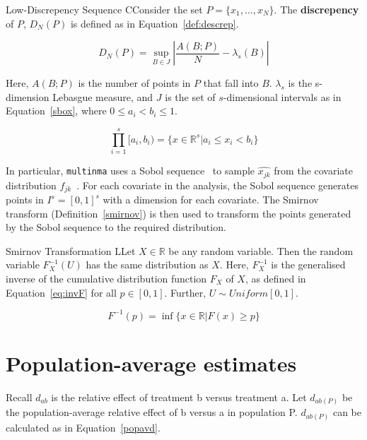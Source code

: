 \begin{definition}{Low-Discrepency Sequence}
    CConsider the set $P = \{x_1, \ldots, x_N\}$. The \textbf{discrepency} of $P$, $D_N(P)$ is defined as in Equation~\ref{def:descrep}.

    \begin{equation}
        D_N(P) = \sup_{B \in J}\left|\frac{A(B;P)}{N} - \lambda_s(B)\right|
        \label{def:descrep}
    \end{equation}

    Here, $A(B;P)$ is the number of points in $P$ that fall into $B$. $\lambda_s$ is the s-dimension Lebasgue measure, and $J$ is the set of $s$-dimensional intervals as in Equation~\ref{sbox}, where $0 \leq a_i < b_i \leq 1$.
    
    \begin{equation}
        \prod_{i = 1}^{s} [a_i,b_i) = \{x \in \mathbb{R}^s | a_i \leq x_i < b_i \}
        \label{sbox}
    \end{equation}
\label{discrepency}
\end{definition}

In particular, \verb|multinma| uses a Sobol sequence~\cite{sobol} to sample $\hat{x_{jk}}$ from the covariate distribution $f_{jk}$~\cite{phillippo2020}. For each covariate in the analysis, the Sobol sequence generates points in $I^s = [0,1]^s$ with a dimension for each covariate. The Smirnov transform (Definition~\ref{smirnov}) is then used to transform the points generated by the Sobol sequence to the required distribution. 

\begin{definition}{Smirnov Transformation}
    LLet $X \in \mathbb{R}$ be any random variable. Then the random variable $F_X^{-1}(U)$ has the same distribution as $X$. Here, $F_X^{-1}$ is the generalised inverse of the cumulative distribution function $F_X$ of $X$, as defined in Equation~\ref{eq:invF} for all $p \in [0,1]$. Further, $U \sim Uniform[0,1]$.

    \begin{equation}
        F^{-1}(p) = \inf \{x \in \mathbb{R} | F(x) \geq p \}
        \label{eq:invF}
    \end{equation}
    \label{smirnov}
\end{definition}

\section{Population-average estimates}
Recall $d_{ab}$ is the relative effect of treatment b versus treatment a. Let $d_{ab(P)}$ be the population-average relative effect of b versus a in population P. $d_{ab(P)}$ can be calculated as in Equation~\ref{popavd}. 

